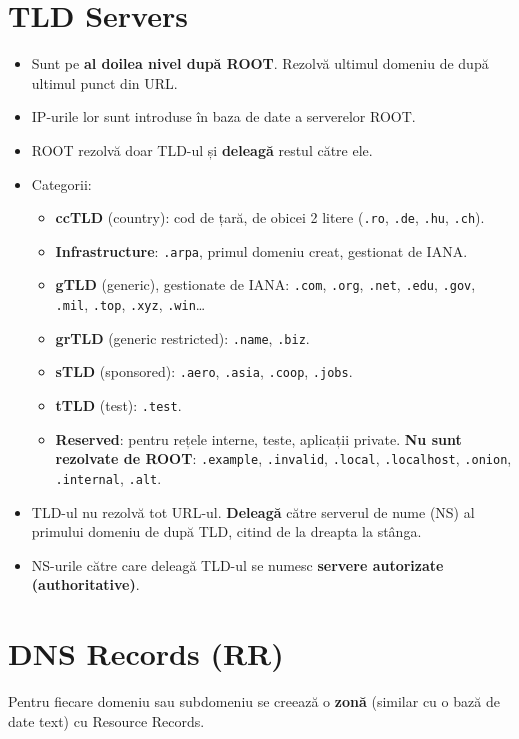 \documentclass[11pt,a4paper]{article}
\newcommand{\cod}[1]{\texttt{#1}}
\begin{document}
\section{TLD Servers}
\begin{itemize}
  \item Sunt pe \textbf{al doilea nivel după ROOT}. Rezolvă ultimul domeniu de după ultimul punct din URL.
  \item IP-urile lor sunt introduse în baza de date a serverelor ROOT.
  \item ROOT rezolvă doar TLD-ul și \textbf{deleagă} restul către ele.
  \item Categorii:
  \begin{itemize}
    \item \textbf{ccTLD} (country): cod de țară, de obicei 2 litere (\cod{.ro}, \cod{.de}, \cod{.hu}, \cod{.ch}).
    \item \textbf{Infrastructure}: \cod{.arpa}, primul domeniu creat, gestionat de IANA.
    \item \textbf{gTLD} (generic), gestionate de IANA: \cod{.com}, \cod{.org}, \cod{.net}, \cod{.edu}, \cod{.gov}, \cod{.mil}, \cod{.top}, \cod{.xyz}, \cod{.win}\ldots
    \item \textbf{grTLD} (generic restricted): \cod{.name}, \cod{.biz}.
    \item \textbf{sTLD} (sponsored): \cod{.aero}, \cod{.asia}, \cod{.coop}, \cod{.jobs}.
    \item \textbf{tTLD} (test): \cod{.test}.
    \item \textbf{Reserved}: pentru rețele interne, teste, aplicații private. \textbf{Nu sunt rezolvate de ROOT}: \cod{.example}, \cod{.invalid}, \cod{.local}, \cod{.localhost}, \cod{.onion}, \cod{.internal}, \cod{.alt}.
  \end{itemize}
  \item TLD-ul nu rezolvă tot URL-ul. \textbf{Deleagă} către serverul de nume (NS) al primului domeniu de după TLD, citind de la dreapta la stânga.
  \item NS-urile către care deleagă TLD-ul se numesc \textbf{servere autorizate (authoritative)}.
\end{itemize}

\section{DNS Records (RR)}
Pentru fiecare domeniu sau subdomeniu se creează o \textbf{zonă} (similar cu o bază de date text) cu Resource Records.
\end{document}
